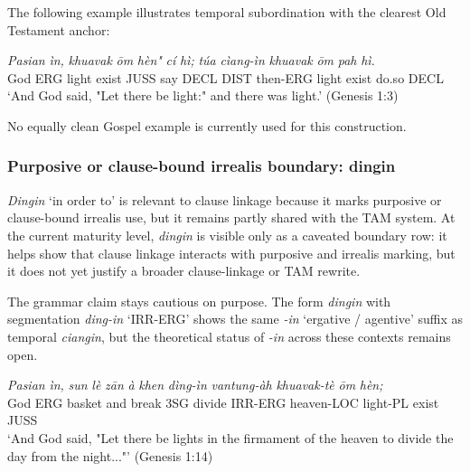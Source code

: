 \documentclass[
  11pt,
  a4paper,
]{article}
\newcommand{\tdim}[1]{\textit{#1}}
\newcommand{\tdimword}[1]{\textit{#1}}
\renewcommand{\textsc}[1]{{\footnotesize\MakeUppercase{#1}}}
\newcommand{\glossquote}[1]{`#1'}
\begin{document}
The following example illustrates temporal subordination with the
clearest Old Testament anchor:

\begin{exe}
\ex \label{ex:clause-ciangin-gen1p3}
\gll \tdimword{Pasian} \tdimword{ìn,} \tdimword{khuavak} \tdimword{ōm} \tdimword{hèn"} \tdimword{cí} \tdimword{hì;} \tdimword{túa} \tdimword{cìang-ìn} \tdimword{khuavak} \tdimword{ōm} \tdimword{pah} \tdimword{hì.} \\
     God \textsc{erg} light exist \textsc{juss} say \textsc{decl} \textsc{dist} then-\textsc{erg} light exist do.so \textsc{decl} \\
\glt \glossquote{And God said, "Let there be light:" and there was light.} (Genesis 1:3)
\end{exe}

No equally clean Gospel example is currently used for this construction.

\subsubsection{Purposive or clause-bound irrealis boundary:
dingin}\label{purposive-or-clause-bound-irrealis-boundary-dingin}

\tdim{Dingin} \glossquote{in order to} is relevant to clause linkage
because it marks purposive or clause-bound irrealis use, but it remains
partly shared with the TAM system. At the current maturity level,
\tdim{dingin} is visible only as a caveated boundary row: it helps show
that clause linkage interacts with purposive and irrealis marking, but
it does not yet justify a broader clause-linkage or TAM rewrite.

The grammar claim stays cautious on purpose. The form \tdim{dingin} with
segmentation \tdim{ding-in} \glossquote{IRR-ERG} shows the same
\tdim{-in} \glossquote{ergative / agentive} suffix as temporal
\tdim{ciangin}, but the theoretical status of \tdim{-in} across these
contexts remains open.

\begin{exe}
\ex \label{ex:clause-dingin-gen1p14}
\gll \tdimword{Pasian} \tdimword{ìn,} \tdimword{sun} \tdimword{lè} \tdimword{zān} \tdimword{à} \tdimword{khen} \tdimword{dìng-ìn} \tdimword{vantung-àh} \tdimword{khuavak-tè} \tdimword{ōm} \tdimword{hèn;} \\
     God \textsc{erg} basket and break \textsc{3sg} divide \textsc{irr}-\textsc{erg} heaven-\textsc{loc} light-\textsc{pl} exist \textsc{juss} \\
\glt \glossquote{And God said, "Let there be lights in the firmament of the heaven to divide the day from the night..."} (Genesis 1:14)
\end{exe}
\end{document}
